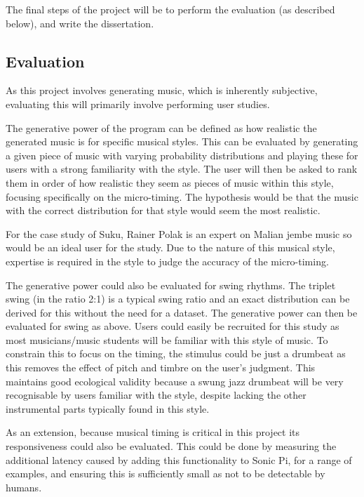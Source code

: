 \documentclass[12pt,twoside,openright]{report}
\begin{document}
\begin{refsection}
The final steps of the project will be to perform the evaluation (as described
below), and write the dissertation.


\subsection*{Evaluation}

As this project involves generating music, which is inherently subjective,
evaluating this will primarily involve performing user studies.

The generative power of the program can be defined as how realistic the
generated music is for specific musical styles. This can be evaluated by
generating a given piece of music with varying probability distributions and
playing these for users with a strong familiarity with the style. The user will
then be asked to rank them in order of how realistic they seem as pieces of
music within this style, focusing specifically on the micro-timing. The
hypothesis would be that the music with the correct distribution for that style
would seem the most realistic.

For the case study of Suku, Rainer Polak is an expert on Malian jembe music so
would be an ideal user for the study. Due to the nature of this musical style,
expertise is required in the style to judge the accuracy of the micro-timing.

The generative power could also be evaluated for swing rhythms. The triplet
swing (in the ratio 2:1) is a typical swing ratio and an exact distribution can
be derived for this without the need for a dataset. The generative power can
then be evaluated for swing as above. Users could easily be recruited for this
study as most musicians/music students will be familiar with this style of music.
To constrain this to focus on the timing, the stimulus could be just a drumbeat
as this removes the effect of pitch and timbre on the user's judgment. This
maintains good ecological validity because a swung jazz drumbeat will be very
recognisable by users familiar with the style, despite lacking the other
instrumental parts typically found in this style.

As an extension, because musical timing is critical in this project its
responsiveness could also be evaluated. This could be done by measuring the
additional latency caused by adding this functionality to Sonic Pi, for a range
of examples, and ensuring this is sufficiently small as not to be detectable by
humans.




\end{refsection}
\end{document}
